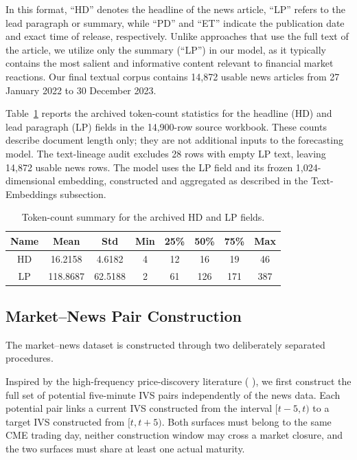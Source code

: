 In this format, ``HD'' denotes the headline of the news article, ``LP'' refers to the lead paragraph or summary, while ``PD'' and ``ET'' indicate the publication date and exact time of release, respectively. Unlike approaches that use the full text of the article, we utilize only the summary (``LP'') in our model, as it typically contains the most salient and informative content relevant to financial market reactions. Our final textual corpus contains 14,872 usable news articles from 27 January 2022 to 30 December 2023.



Table~\ref{tab:ch3:summary_news} reports the archived token-count statistics
for the headline (HD) and lead paragraph (LP) fields in the 14,900-row source
workbook.  These counts describe document length only; they are not additional
inputs to the forecasting model.  The text-lineage audit excludes 28 rows
with empty LP text, leaving 14,872 usable news rows.  The model uses the LP
field and its frozen 1,024-dimensional embedding, constructed and aggregated
as described in the Text-Embeddings subsection.

\begin{table}[htbp]
\centering
\footnotesize
\begin{tabular}{cccccccc}
\toprule
Name& Mean & Std & Min & 25\% & 50\% & 75\% & Max \\
\midrule
HD& 16.2158 & 4.6182 & 4 & 12 & 16 & 19 & 46 \\
LP& 118.8687 & 62.5188 & 2 & 61 & 126 & 171 & 387 \\
\bottomrule
\end{tabular}
\caption{Token-count summary for the archived HD and LP fields.}
\label{tab:ch3:summary_news}
\end{table}


\subsection*{Market--News Pair Construction}
\label{subsec:ch3:market_news_pairs}

The market--news dataset is constructed through two deliberately separated procedures. 

Inspired by the high-frequency price-discovery literature (\cite{andersen2007realtime, bradley2014analysts, grossklussmann2011machines} ), we first construct the full set of potential five-minute IVS pairs independently of the news data. Each potential pair links a current IVS constructed from the interval $[t-5,t)$ to a target IVS constructed from $[t,t+5)$. Both surfaces must belong to the same CME trading day, neither construction window may cross a market closure, and the two surfaces must share at least one actual maturity. 

